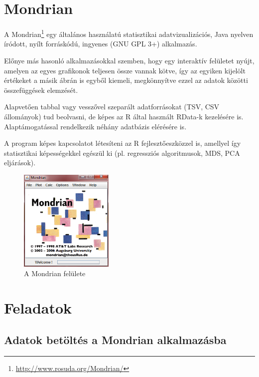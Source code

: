 \documentclass[a4paper,10pt,titlepage]{article}
\begin{document}
\section{Mondrian}

A Mondrian\footnote{\url{http://www.rosuda.org/Mondrian/}} egy általános használatú statisztikai adatvizualizációs, Java nyelven íródott, nyílt forráskódú, ingyenes (GNU GPL 3+) alkalmazás.

Előnye más hasonló alkalmazásokkal szemben, hogy egy interaktív felületet nyújt, amelyen az egyes grafikonok teljesen össze vannak kötve, így az egyiken kijelölt értékeket a másik ábrán is egyből kiemeli, megkönnyítve ezzel az adatok közötti összefüggések elemzését.

Alapvetően tabbal vagy vesszővel szeparált adatforrásokat (TSV, CSV állományok) tud beolvasni, de képes az R által használt RData-k kezelésére is. Alaptámogatással rendelkezik néhány adatbázis elérésére is.

A program képes kapcsolatot létesíteni az R fejlesztőeszközzel is, amellyel így statisztikai képességekkel egészül ki (pl. regressziós algoritmusok, MDS, PCA eljárások).

\begin{figure}[h!]
\centering
\includegraphics[width=0.40\textwidth]{figures/mondrian_app.png}
\caption{A Mondrian felülete \label{fig:mondrian_app}}
\end{figure}

\section{Feladatok}

\subsection{Adatok betöltés a Mondrian alkalmazásba}
\end{document}
